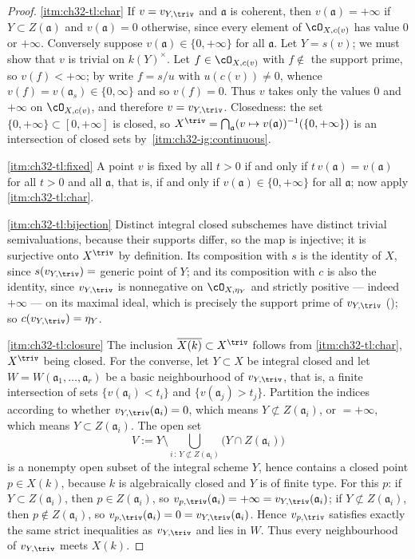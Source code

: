 \begin{proof}
\cref{itm:ch32-tl:char}  If $v=v_{Y,\triv}$ and $\mathfrak a$ is coherent,
then $v(\mathfrak a)=+\infty$ if $Y\subset Z(\mathfrak a)$ and
$v(\mathfrak a)=0$ otherwise, since every element of $\cO_{X,c(v)}$ has
value $0$ or $+\infty$.  Conversely suppose
$v(\mathfrak a)\in\{0,+\infty\}$ for all $\mathfrak a$.  Let
$Y=s(v)$; we must show that $v$ is trivial on $k(Y)^\times$.  Let
$f\in\cO_{X,c(v)}$ with $f\notin$ the support prime, so
$v(f)<+\infty$; by  write
$f=s/u$ with $u(c(v))\neq0$, whence $v(f)=v(\mathfrak a_s)\in\{0,\infty\}
$ and so $v(f)=0$.  Thus $v$ takes only the values $0$ and $+\infty$
on $\cO_{X,c(v)}$, and therefore $v=v_{Y,\triv}$.  Closedness: the set
$\{0,+\infty\}\subset[0,+\infty]$ is closed, so
$X^{\triv}=\bigcap_{\mathfrak a}(v\mapsto v(\mathfrak a))^{-1}
(\{0,+\infty\})$ is an intersection of closed sets by
\,\cref{itm:ch32-ig:continuous}.

\cref{itm:ch32-tl:fixed}  A point $v$ is fixed by all $t>0$ if and only if
$t\,v(\mathfrak a)=v(\mathfrak a)$ for all $t>0$ and all
$\mathfrak a$, that is, if and only if
$v(\mathfrak a)\in\{0,+\infty\}$ for all $\mathfrak a$; now apply
\cref{itm:ch32-tl:char}.

\cref{itm:ch32-tl:bijection}  Distinct integral closed subschemes have
distinct trivial semivaluations, because their supports differ, so the map is
injective; it is surjective onto $X^{\triv}$ by definition.  Its
composition with $s$ is the identity of $X$, since
$s(v_{Y,\triv})=$ generic point of $Y$; and its composition with $c$ is
also the identity, since $v_{Y,\triv}$ is nonnegative on
$\cO_{X,\eta_Y}$ and strictly positive --- indeed $+\infty$ --- on its
maximal ideal, which is precisely the support prime of $v_{Y,\triv}$
(); so $c(v_{Y,\triv})=\eta_Y$.

\cref{itm:ch32-tl:closure}  The inclusion $\overline{X(k)}\subset X^{\triv}$
follows from \cref{itm:ch32-tl:char}, $X^{\triv}$ being closed.  For the
converse, let $Y\subset X$ be integral closed and let
$W=W(\mathfrak a_1,\ldots,\mathfrak a_r)$ be a basic neighbourhood of
$v_{Y,\triv}$, that is, a finite intersection of sets
$\{v(\mathfrak a_i)<t_i\}$ and $\{v(\mathfrak a_j)>t_j\}$.  Partition the
indices according to whether $v_{Y,\triv}(\mathfrak a_i)=0$, which means
$Y\not\subset Z(\mathfrak a_i)$, or $=+\infty$, which means
$Y\subset Z(\mathfrak a_i)$.  The open set
\[
 V:=Y\setminus\bigcup_{i\,:\,Y\not\subset Z(\mathfrak a_i)}
 \bigl(Y\cap Z(\mathfrak a_i)\bigr)
\]
is a nonempty open subset of the integral scheme $Y$, hence contains a
closed point $p\in X(k)$, because $k$ is algebraically closed and $Y$
is of finite type.  For this $p$: if $Y\subset Z(\mathfrak a_i)$, then
$p\in Z(\mathfrak a_i)$, so $v_{p,\triv}(\mathfrak a_i)=+\infty
=v_{Y,\triv}(\mathfrak a_i)$; if $Y\not\subset Z(\mathfrak a_i)$, then
$p\notin Z(\mathfrak a_i)$, so
$v_{p,\triv}(\mathfrak a_i)=0=v_{Y,\triv}(\mathfrak a_i)$.  Hence
$v_{p,\triv}$ satisfies exactly the same strict inequalities as
$v_{Y,\triv}$ and lies in $W$.  Thus every neighbourhood of
$v_{Y,\triv}$ meets $X(k)$.


\end{proof}
